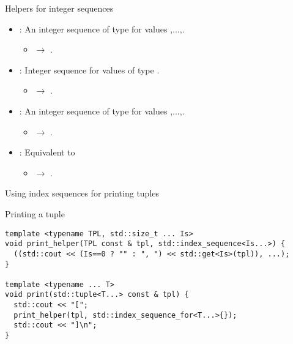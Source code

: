 \begin{frame}[t,fragile]{Helpers for integer sequences}
\begin{itemize}
  \item {}:
        An integer sequence of type  for values ,...,.
    \begin{itemize}
      \item {} $\rightarrow$ 
            .
    \end{itemize}

  \item {}: 
        Integer sequence for values of type .
    \begin{itemize}
      \item {} $\rightarrow$ .
    \end{itemize}

  \item {}:
        An integer sequence of type  for values ,...,.
    \begin{itemize}
      \item {} $\rightarrow$ 
            .
    \end{itemize}

  \item {}:
        Equivalent to 
    \begin{itemize}
      \item {}\cppid{>} $\rightarrow$ 
            .
    \end{itemize}
  
\end{itemize}
\end{frame}

\begin{frame}[t,fragile]{Using index sequences for printing tuples}
\begin{block}{Printing a tuple}
\begin{lstlisting}
template <typename TPL, std::size_t ... Is>
void print_helper(TPL const & tpl, std::index_sequence<Is...>) {
  ((std::cout << (Is==0 ? "" : ", ") << std::get<Is>(tpl)), ...);
}

template <typename ... T>
void print(std::tuple<T...> const & tpl) {
  std::cout << "[";
  print_helper(tpl, std::index_sequence_for<T...>{});
  std::cout << "]\n";
}
\end{lstlisting}
\end{block}
\end{frame}
